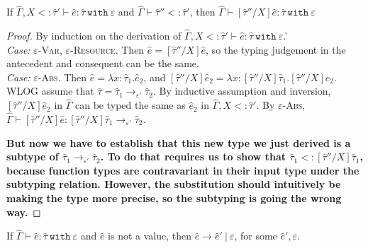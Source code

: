\documentclass{llncs}
\newcommand{\keywadj}[1]{\mathtt{#1}}
\newcommand{\keyw}[1]{\keywadj{#1}~}
\newcommand{\kw}[1]{\keyw{ #1 }}
\begin{document}
\hrulefill

\begin{lemma}
If $\hat \Gamma, X <: \hat \tau' \vdash \hat e: \hat \tau~\kw{with} \varepsilon$ and $\hat \Gamma \vdash \hat \tau'' <: \hat \tau'$, then $\hat \Gamma \vdash [\hat \tau''/X]\hat e: \hat \tau~\kw{with} \varepsilon$
\end{lemma}

\begin{proof} By induction on the derivation of $\hat \Gamma, X <: \hat \tau' \vdash \hat e: \hat \tau~\kw{with} \varepsilon$.'\\

\textit{Case:} \textsc{$\varepsilon$-Var, $\varepsilon$-Resource}. Then $\hat e = [\hat \tau''/X]\hat e$, so the typing judgement in the antecedent and consequent can be the same.\\

\textit{Case:} \textsc{$\varepsilon$-Abs}. Then $\hat e = \lambda x: \hat \tau_1. \hat e_2$, and $[\hat \tau''/X]\hat e_2 = \lambda x: [\hat \tau''/X]\hat \tau_1. [\hat \tau''/X]\hat e_2$. WLOG assume that $\hat \tau = \hat \tau_1 \rightarrow_{\varepsilon'} \hat \tau_2$. By inductive assumption and inversion, $[\hat \tau''/X]\hat e_2$  in $\hat \Gamma$ can be typed the same as $\hat e_2$ in $\hat \Gamma, X <: \hat \tau'$. By \textsc{$\varepsilon$-Abs}, $\hat \Gamma \vdash [\hat \tau''/X]\hat e : [\hat \tau''/X]\hat \tau_1 \rightarrow_{\varepsilon'} \hat \tau_2$.

\textbf{But now we have to establish that this new type we just derived is a subtype of $\hat \tau_1 \rightarrow_{\varepsilon'} \hat \tau_2$. To do that requires us to show that $\hat \tau_1 <: [\hat \tau''/X]\hat \tau_1$, because function types are contravariant in their input type under the subtyping relation. However, the substitution should intuitively be making the type more precise, so the subtyping is going the wrong way. }

\end{proof}



\hrulefill

\begin{theorem}[Progress]
If $\hat \Gamma \vdash \hat e: \hat \tau~\kw{with} \varepsilon$ and $\hat e$ is not a value, then $\hat e \longrightarrow \hat e'~|~\varepsilon$, for some $\hat e', \varepsilon$.
\end{theorem}
\end{document}

